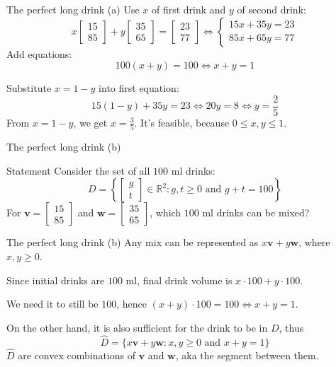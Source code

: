 \documentclass[10pt]{beamer}
\begin{document}
\begin{frame}{The perfect long drink (a)}
    Use $x$ of first drink and $y$ of second drink:
    $$
    x \begin{bmatrix}15 \\ 85\end{bmatrix} + y \begin{bmatrix}35 \\ 65\end{bmatrix} = \begin{bmatrix}23 \\ 77\end{bmatrix} \iff \begin{cases}
        15x + 35y = 23 \\
        85x + 65y = 77
    \end{cases}
    $$
    Add equations: $$100(x+y) = 100 \iff x + y = 1$$

    Substitute $x=1-y$ into first equation:
    $$
    15(1-y) + 35y = 23 \iff 20y = 8 \iff y = \frac{2}{5}
    $$
    From $x=1-y$, we get $x = \frac{3}{5}$. It's feasible, because $0 \leq x, y \leq 1$.
\end{frame}

\begin{frame}{The perfect long drink (b)}
    \begin{block}{Statement}
        Consider the set of all $100$ ml drinks:
        $$
        D = \left\{\begin{bmatrix}g \\ t\end{bmatrix} \in \mathbb R^2 : g, t \geq 0 \text{ and }g+t=100\right\}
        $$
        For $\mathbf{v} = \begin{bmatrix}15 \\ 85\end{bmatrix}$ and $\mathbf{w} = \begin{bmatrix}35\\65\end{bmatrix}$, which $100$ ml drinks can be mixed?
    \end{block}
\end{frame}

\begin{frame}{The perfect long drink (b)}
    Any mix can be represented as $x \mathbf{v} + y \mathbf{w}$, where $x, y \geq 0$.

    Since initial drinks are $100$ ml, final drink volume is $x \cdot 100 + y \cdot 100$.

    We need it to still be $100$, hence $(x + y) \cdot 100 = 100 \iff x+y=1$.

    On the other hand, it is also sufficient for the drink to be in $D$, thus
    $$
    \hat D = \{x\mathbf v + y \mathbf w : x, y \geq 0 \text{ and } x+y=1\}
    $$
    $\hat D$ are convex combinations of $\mathbf v$ and $\mathbf w$, aka the segment between them.
\end{frame}
\end{document}
